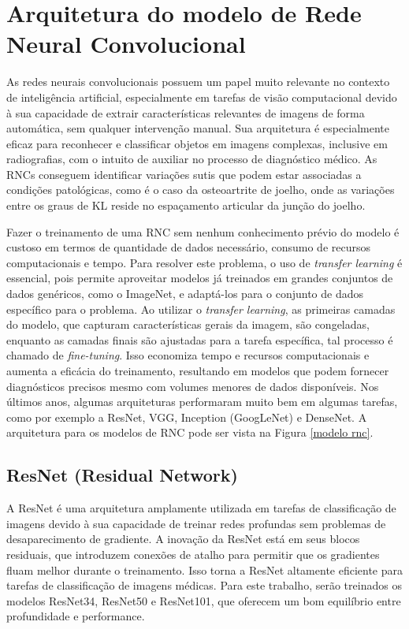 \section{Arquitetura do modelo de Rede Neural Convolucional}

As redes neurais convolucionais possuem um papel muito relevante no contexto de inteligência artificial, especialmente em tarefas de visão computacional devido à sua capacidade de extrair características relevantes de imagens de forma automática, sem qualquer intervenção manual. Sua arquitetura é especialmente eficaz para reconhecer e classificar objetos em imagens complexas, inclusive em radiografias, com o intuito de auxiliar no processo de diagnóstico médico. As RNCs conseguem identificar variações sutis que podem estar associadas a condições patológicas, como é o caso da osteoartrite de joelho, onde as variações entre os graus de KL reside no espaçamento articular da junção do joelho.

Fazer o treinamento de uma RNC sem nenhum conhecimento prévio do modelo é custoso em termos de quantidade de dados necessário, consumo de recursos computacionais e tempo. Para resolver este problema, o uso de \textit{transfer learning} é essencial, pois permite aproveitar modelos já treinados em grandes conjuntos de dados genéricos, como o ImageNet, e adaptá-los para o conjunto de dados específico para o problema. Ao utilizar o \textit{transfer learning}, as primeiras camadas do modelo, que capturam características gerais da imagem, são congeladas, enquanto as camadas finais são ajustadas para a tarefa específica, tal processo é chamado de \textit{fine-tuning}. Isso economiza tempo e recursos computacionais e aumenta a eficácia do treinamento, resultando em modelos que podem fornecer diagnósticos precisos mesmo com volumes menores de dados disponíveis. Nos últimos anos, algumas arquiteturas performaram muito bem em algumas tarefas, como por exemplo a ResNet, VGG, Inception (GoogLeNet) e DenseNet. A arquitetura para os modelos de RNC pode ser vista na Figura \ref{modelo rnc}.

\subsection{ResNet (Residual Network)}

A ResNet \cite{He2016} é uma arquitetura amplamente utilizada em tarefas de classificação de imagens devido à sua capacidade de treinar redes profundas sem problemas de desaparecimento de gradiente. A inovação da ResNet está em seus blocos residuais, que introduzem conexões de atalho para permitir que os gradientes fluam melhor durante o treinamento. Isso torna a ResNet altamente eficiente para tarefas de classificação de imagens médicas. Para este trabalho, serão treinados os modelos ResNet34, ResNet50 e ResNet101, que oferecem um bom equilíbrio entre profundidade e performance.

